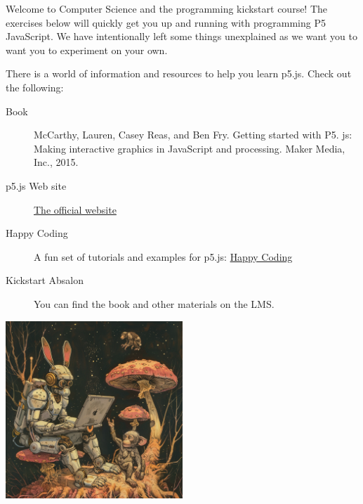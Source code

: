 \documentclass{ucph-handout}
\begin{document}
\begin{exercisebox}[adjusted title=Welcome to Kickstart]
Welcome to Computer Science and the programming kickstart course!
The exercises below will quickly get you up and running with programming P5 JavaScript. We have intentionally left some things unexplained as we want you to want you to experiment on your own.
\end{exercisebox}
\begin{exercisebox}[adjusted title=Resources]
There is a world of information and resources to help you learn p5.js. Check out the following:
\begin{description}
\item[Book] McCarthy, Lauren, Casey Reas, and Ben Fry. Getting started with P5. js: Making interactive graphics in JavaScript and processing. Maker Media, Inc., 2015.
\item[p5.js Web site] \href{https://p5js.org/}{The official website}
\item[Happy Coding] A fun set of tutorials and examples for p5.js: \href{https://happycoding.io/}{Happy Coding}
\item[Kickstart Absalon] You can find the book and other materials on the LMS.
\end{description}
\end{exercisebox}
\begin{exercisebox}[adjusted title=Have Fun]
\begin{center}
\includegraphics[width=0.5\textwidth]{illustrationer/monkey_fun.png}
\end{center}
\end{exercisebox}








%







\end{document}
